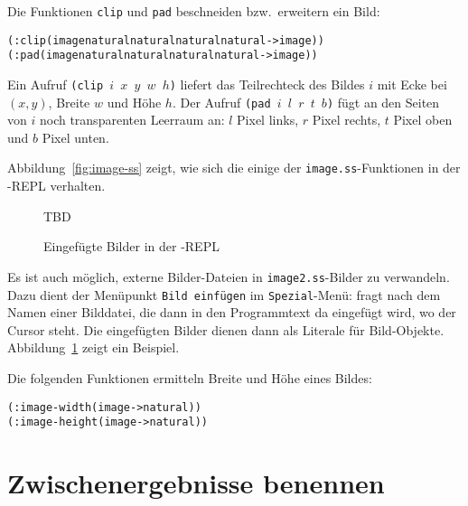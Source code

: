 Die Funktionen \texttt{clip} und \texttt{pad} beschneiden bzw.\
erweitern ein Bild:
%
\begin{alltt}
(: clip (image natural natural natural natural -> image))
(: pad  (image natural natural natural natural -> image))
\end{alltt}
%
Ein Aufruf \texttt{(clip $i$ $x$ $y$ $w$ $h$)} liefert 
das Teilrechteck des Bildes $i$ mit Ecke bei $(x, y)$, Breite $w$ und
Höhe $h$.  Der Aufruf \texttt{(pad $i$ $l$ $r$ $t$ $b$)}
fügt an den Seiten von $i$ noch transparenten Leerraum an: $l$ Pixel
links, $r$ Pixel rechts, $t$ Pixel oben und $b$ Pixel unten.

Abbildung~\ref{fig:image-ss} zeigt, wie sich die einige der
\texttt{image.ss}-Funktionen in der \drscheme{}-REPL verhalten.

\begin{figure}
  \centering
  TBD
  \caption{Eingefügte Bilder in der \drscheme{}-REPL}
  \label{fig:image-insert}
\end{figure}
%
Es ist auch möglich, externe Bilder-Dateien in
\texttt{image2.ss}-Bilder zu verwandeln.  Dazu dient der Menüpunkt
\texttt{Bild einfügen} im \texttt{Spezial}-Menü:  \drscheme{} fragt nach dem
Namen einer Bilddatei, die dann in den Programmtext da eingefügt wird,
wo der Cursor steht.  Die eingefügten Bilder dienen dann als
Literale für Bild-Objekte.  Abbildung~\ref{fig:image-insert} zeigt ein
Beispiel.

Die folgenden Funktionen ermitteln Breite und Höhe
eines Bildes:
%
\begin{alltt}
(: image-width  (image -> natural))
(: image-height (image -> natural))
\end{alltt}

\section{Zwischenergebnisse benennen}
\label{sec:let}

